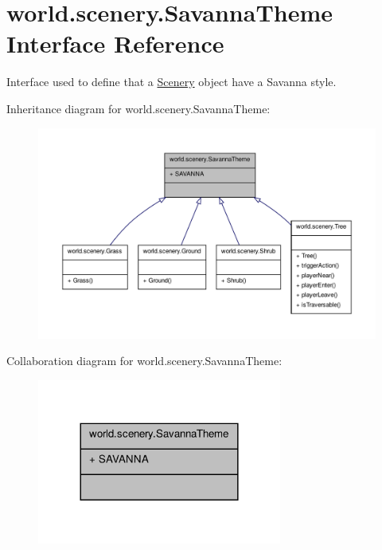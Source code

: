 \hypertarget{interfaceworld_1_1scenery_1_1_savanna_theme}{\section{world.\-scenery.\-Savanna\-Theme Interface Reference}
\label{interfaceworld_1_1scenery_1_1_savanna_theme}
}


Interface used to define that a \hyperlink{classworld_1_1scenery_1_1_scenery}{Scenery} object have a Savanna style.  




Inheritance diagram for world.\-scenery.\-Savanna\-Theme\-:
\nopagebreak
\begin{figure}[H]
\begin{center}
\leavevmode
\includegraphics[width=350pt]{interfaceworld_1_1scenery_1_1_savanna_theme__inherit__graph}
\end{center}
\end{figure}


Collaboration diagram for world.\-scenery.\-Savanna\-Theme\-:
\nopagebreak
\begin{figure}[H]
\begin{center}
\leavevmode
\includegraphics[width=228pt]{interfaceworld_1_1scenery_1_1_savanna_theme__coll__graph}
\end{center}
\end{figure}
